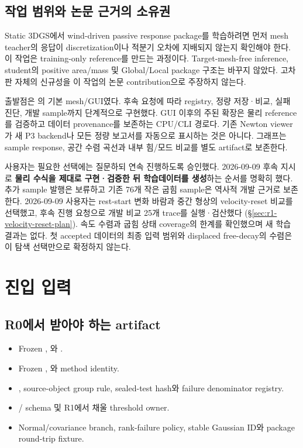\documentclass[10pt]{article}
\begin{document}
\subsection{작업 범위와 논문 근거의 소유권}

Static 3DGS에서 wind-driven passive response package를 학습하려면 먼저 mesh teacher의 응답이
discretization이나 적분기 오차에 지배되지 않는지 확인해야 한다. 이 작업은 training-only reference를
만드는 과정이다. Target-mesh-free inference, student의 positive area/mass 및 Global/Local package
구조는 바꾸지 않았다. 고차 판 자체의 신규성을 이 작업의 논문 contribution으로 주장하지 않는다.

출발점은 의 기본 mesh/GUI였다.
후속 요청에 따라 registry, 정량 저장·비교, 실패 진단, 개발 sample까지 단계적으로 구현했다.
GUI 이후의 주된 확장은 물리 reference를 검증하고 데이터 provenance를 보존하는 CPU/CLI 경로다.
기존 Newton viewer가 새 P3 backend나 모든 정량 보고서를 자동으로 표시하는 것은 아니다.
그래프는 sample response, 공간 수렴 곡선과 내부 힘/모드 비교를 별도 artifact로 보존한다.

사용자는 필요한 선택에는 질문하되 연속 진행하도록 승인했다.
2026-09-09 후속 지시로 \textbf{물리 수식을 제대로 구현·검증한 뒤 학습데이터를 생성}하는 순서를
명확히 했다. 추가 sample 발행은 보류하고 기존 76개 작은 굽힘 sample은 역사적 개발 근거로 보존한다.
2026-09-09 사용자는 rest-start 변화 바람과 중간 형상의 velocity-reset 비교를 선택했고,
후속 진행 요청으로 개발 비교 25개 trace를 실행·검산했다 (\S\ref{sec:r1-velocity-reset-plan}).
속도 수렴과 굽힘 상태 coverage의 한계를 확인했으며 새 학습 결과는 없다.
첫 accepted 데이터의 최종 입력 범위와 displaced free-decay의 수렴은 이 탐색 선택만으로 확정하지 않는다.

\section{진입 입력}
\label{sec:r1-chapter-2}
\subsection{R0에서 받아야 하는 artifact}

\begin{itemize}
  \item Frozen , 와 .
  \item Frozen , 와 method identity.
  \item {}, source-object group rule, sealed-test hash와 failure denominator registry.
  \item {}/ schema 및 R1에서 채울 threshold owner.
  \item Normal/covariance branch, rank-failure policy, stable Gaussian ID와 package round-trip fixture.
\end{itemize}
\end{document}
